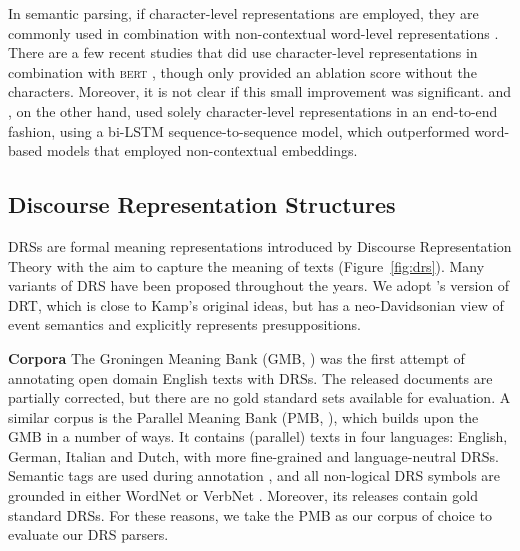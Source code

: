 \documentclass[11pt,a4paper]{article}
\newcommand{\bert}{\textsc{bert}}
\newcommand{\inlineheader}[1]{\vspace{0.06cm}
\noindent\textbf{#1}\quad
}
\begin{document}
In semantic parsing, if character-level representations are employed, they are commonly used in combination with non-contextual word-level representations \citep{lewis-etal-2016-lstm, ballesteros2017amr,groschwitz-etal-2018-amr, cai-lam-2019-core}. There are a few recent studies that did use character-level representations in combination with \bert{} \citep{zhang-etal-2019-amr,zhang-etal-2019-broad,cai-lam-2020-amr}, though only \citet{zhang-etal-2019-amr} provided an ablation score without the characters. Moreover, it is not clear if this small improvement was significant.
\citet{clinAMR:17} and \citet{drstacl:18}, on the other hand, used solely character-level representations in an end-to-end fashion, using a bi-LSTM sequence-to-sequence model, which outperformed word-based models that employed non-contextual embeddings.

\subsection{Discourse Representation Structures}
\label{sec:backgrounddrs}

DRSs are formal meaning representations introduced by Discourse Representation Theory \citep{kampreyle:drt} with the aim to capture the meaning of texts (Figure~\ref{fig:drs}).
Many variants of DRS have been proposed throughout the years.
We adopt 
\citet{venhuizen2018discourse}'s version of DRT, which is close to Kamp's original ideas, but has 
a neo-Davidsonian view of event semantics and explicitly represents presuppositions.

\inlineheader{Corpora} The Groningen Meaning Bank (GMB, \citealp{gmb:eacl,GMB:2017}) was the first attempt of annotating open domain English texts with DRSs. The released documents are partially corrected, but there are no gold standard sets available for evaluation. A similar corpus is the Parallel Meaning Bank (PMB, \citealp{eacl:pmb}), which builds upon the GMB in a number of ways. It contains (parallel) texts in four languages: English, German, Italian and Dutch, with more fine-grained and language-neutral DRSs. Semantic tags are used during annotation \citep{Bjervaetal:16, semantic-tagset:17}, and all non-logical DRS symbols are  grounded in either WordNet \citep{wordnet} or VerbNet \citep{Bonial:11}. Moreover, its releases contain gold standard DRSs. For these reasons, we take the PMB as our corpus of choice to evaluate our DRS parsers.
\end{document}
